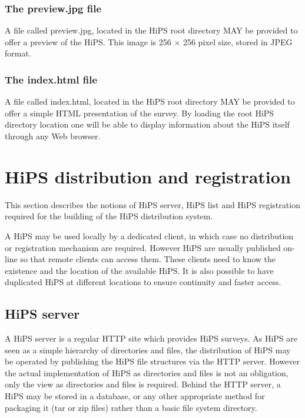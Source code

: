 \documentclass[11pt,a4paper]{ivoa}
\begin{document}
\subsubsection{The preview.jpg file}

A file called preview.jpg, located in the HiPS root directory MAY be provided to offer a preview of the HiPS. This image is 256 × 256 pixel size, stored in JPEG format.

\subsubsection{The index.html file}

A file called index.html, located in the HiPS root directory MAY be provided to offer a simple HTML presentation of the survey. By loading the root HiPS directory location one will be able to display information about the HiPS itself through any Web browser. 

\section{HiPS distribution and registration}
\label{sec:distribution}

This section describes the notions of HiPS server, HiPS list and HiPS registration required for the building of the HiPS distribution system.

A HiPS may be used locally by a dedicated client, in which case no distribution or registration mechanism are required. However HiPS are usually published on-line so that remote clients can access them. These clients need to know the existence and the location of the available HiPS. It is also possible to have duplicated HiPS at different locations to ensure continuity and faster access.

\subsection{HiPS server}

A HiPS server is a regular HTTP site which provides HiPS surveys. As HiPS are seen as a simple hierarchy of directories and files, the distribution of HiPS may be operated by publishing the HiPS file structures via the HTTP server. However the actual implementation of HiPS as directories and files is not an obligation, only the view as directories and files is required. Behind the HTTP server, a HiPS may be stored in a database, or any other appropriate method for packaging it (tar or zip files) rather than a basic file system directory.
\end{document}
